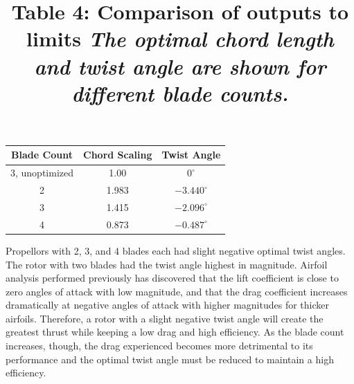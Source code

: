 \documentclass{article}
\begin{document}
\centering
\title{Table 4: Comparison of outputs to limits \newline}
\title{\emph{The optimal chord length and twist angle are shown for different blade counts.}} \label{table:3} \newline
\begin{tabular}{| c | c | c |}
	 \hline
	 \textbf{Blade Count} & \textbf{Chord Scaling} & \textbf{Twist Angle} \\ \hline
	 3, unoptimized & 1.00 & $0^{\circ}$ \\
	 2 & 1.983 & $-3.440^{\circ}$ \\
	 3 & 1.415 & $-2.096^{\circ}$ \\
	 4 & 0.873 & $-0.487^{\circ}$ \\ \hline
\end{tabular} \break \newline

\raggedright
Propellors with 2, 3, and 4 blades each had slight negative optimal twist angles. The rotor with two blades had the twist angle highest in magnitude. Airfoil analysis performed previously has discovered that the lift coefficient is close to zero angles of attack with low magnitude, and that the drag coefficient increases dramatically at negative angles of attack with higher magnitudes for thicker airfoils. Therefore, a rotor with a slight negative twist angle will create the greatest thrust while keeping a low drag and high efficiency. As the blade count increases, though, the drag experienced becomes more detrimental to its performance and the optimal twist angle must be reduced to maintain a high efficiency. \newline
\end{document}
